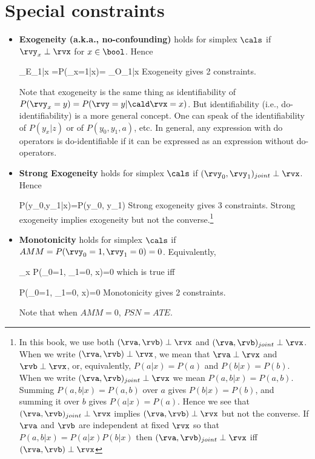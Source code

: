 \section{Special constraints}
\begin{itemize}
\item
{\bf Exogeneity (a.k.a., no-confounding)}
holds for simplex $\cals$
if
$\rvy_x\perp \rvx$ for $x\in\bool$.
 Hence

\beq
{}_{E_{1|x}}
=P(\rvy_x=1|x)=
_{O_{1|x}}
\quad {}
\eeq
Exogeneity gives {\color{red}2 constraints}.

Note that exogeneity
is the same thing as identifiability 
of $P(\rvy_x=y)=P(\rvy=y|\cald\rvx=x)$.
But identifiability
(i.e., do-identifiability) is a more 
general concept. One can speak
of the identifiability of $P(y_x|z)$
or of $P(y_0, y_1, a)$, etc.
In general,
any expression with 
do operators is do-identifiable
if it can be expressed 
as an expression without 
do-operators.

\item
{\bf Strong Exogeneity} holds 
for simplex $\cals$
if $(\rvy_0, \rvy_1)_{joint}
\perp \rvx$. Hence

\beq
P(y_0,y_1|x)=P(y_0, y_1)
\label{eq-strong-exogen}
\eeq
Strong exogeneity gives {\color{red} 3 constraints}.
Strong exogeneity implies
exogeneity
but not the converse.\footnote{In
this book, we use both 
$(\rva, \rvb)\perp \rvx$
and $(\rva, \rvb)_{joint}\perp \rvx$.
When we write $(\rva, \rvb)\perp \rvx$,
we mean that
$\rva\perp \rvx$
and $\rvb\perp\rvx$,
or, equivalently,
$P(a|x)=P(a)$
and $P(b|x)=P(b)$.
When we write
$(\rva, \rvb)_{joint}\perp \rvx$
we mean $P(a,b|x)=P(a,b)$.
Summing
$P(a,b|x)=P(a,b)$
over $a$ gives
$P(b|x)=P(b)$,
and summing it
over $b$ gives 
$P(a|x)=P(a)$.
Hence we see that
 $(\rva, \rvb)_{joint}\perp \rvx$
implies
$(\rva, \rvb)\perp \rvx$
but not the converse.
If $\rva$ and $\rvb$ are independent at
fixed $\rvx$ so that 
$P(a,b|x)=P(a|x)P(b|x)$ then
$(\rva, \rvb)_{joint}\perp \rvx$
iff
$(\rva, \rvb)\perp \rvx$
}
\item
{\bf Monotonicity} holds for simplex $\cals$ if $AMM=P(\rvy_0=1,
 \rvy_1=0)=0$. Equivalently,

\beq
\sum_x P(\rvy_0=1, \rvy_1=0, x)=0
\eeq
which is true iff

\beq
 P(\rvy_0=1, \rvy_1=0, x)=0\quad
{}
\eeq
Monotonicity gives {\color{red} 2 
constraints}.

Note that when $AMM=0$, $PSN=ATE$.
\end{itemize}



